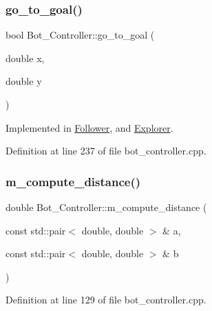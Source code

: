 \subsubsection{\texorpdfstring{go\+\_\+to\+\_\+goal()}{go\_to\_goal()}}
{\footnotesize\ttfamily bool Bot\+\_\+\+Controller\+::go\+\_\+to\+\_\+goal (\begin{DoxyParamCaption}\item[{double}]{x,  }\item[{double}]{y }\end{DoxyParamCaption})\hspace{0.3cm}{\ttfamily [pure virtual]}}



Implemented in \hyperlink{class_follower_ab4e7d953f54be23aadd7ed081d01ea2c}{Follower}, and \hyperlink{class_explorer_aaf31add48ee079244fbdc7aaa574c72b}{Explorer}.



Definition at line 237 of file bot\+\_\+controller.\+cpp.

\mbox{\label{class_bot___controller_ac099bee38ac176cc8de6a6f78581eaa1}} 
\subsubsection{\texorpdfstring{m\+\_\+compute\+\_\+distance()}{m\_compute\_distance()}}
{\footnotesize\ttfamily double Bot\+\_\+\+Controller\+::m\+\_\+compute\+\_\+distance (\begin{DoxyParamCaption}\item[{const std\+::pair$<$ double, double $>$ \&}]{a,  }\item[{const std\+::pair$<$ double, double $>$ \&}]{b }\end{DoxyParamCaption})\hspace{0.3cm}{\ttfamily [protected]}}



Definition at line 129 of file bot\+\_\+controller.\+cpp.

\mbox{\label{class_bot___controller_affa0d8469972f97d731d72c8654a9f90}} 
